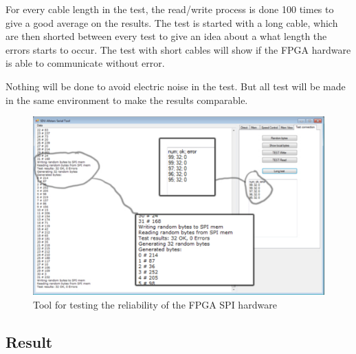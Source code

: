 For every cable length in the test, the read/write process is done 100 times to give a good average on the results. The test is started with a long cable, which are then shorted between every test to give an idea about a what length the errors starts to occur. The test with short cables will show if the FPGA hardware is able to communicate without error.

Nothing will be done to avoid electric noise in the test. But all test will be made in the same environment to make the results comparable.

\begin{figure}[htb] 
	\begin{center}
	\includegraphics[scale=0.6,trim=0 0 0 0]{graphics/spi_testapplication.pdf} %
	\caption{Tool for testing the reliability of the FPGA SPI hardware}
	\label{fig:spi_testapplication}			%
	\end{center}
\end{figure}


\subsection{Result}

